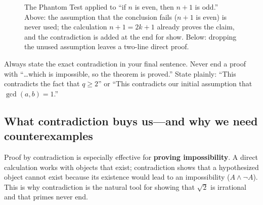 \begin{figure}[htbp]
\caption{The Phantom Test applied to ``if $n$ is even, then $n+1$ is odd.'' Above: the assumption that the conclusion fails ($n+1$ is even) is never used; the calculation $n+1 = 2k+1$ already proves the claim, and the contradiction is added at the end for show. Below: dropping the unused assumption leaves a two-line direct proof.}
\label{08:fig-phantom-contradiction}
\end{figure}

\begin{trapbox}
Always state the exact contradiction in your final sentence. Never end a proof with ``\ldots which is impossible, so the theorem is proved.'' State plainly: ``This contradicts the fact that $q \ge 2$'' or ``This contradicts our initial assumption that $\gcd(a, b) = 1$.''
\end{trapbox}

\subsection{What contradiction buys us---and why we need counterexamples}

Proof by contradiction is especially effective for \textbf{proving impossibility}. A direct calculation works with objects that exist; contradiction shows that a hypothesized object cannot exist because its existence would lead to an impossibility ($A \land \neg A$). This is why contradiction is the natural tool for showing that $\sqrt{2}$ is irrational and that primes never end.

